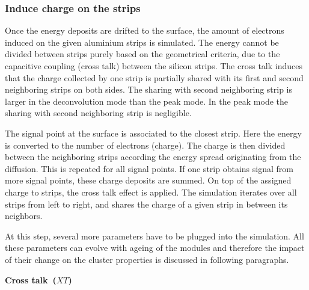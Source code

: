 
\subsubsection{Induce charge on the strips~\label{sec:induce}}

Once the energy deposits are drifted to the surface, the amount of electrons induced on the given aluminium strips is simulated. The energy cannot be divided between strips purely based on the geometrical criteria, due to the capacitive coupling (cross talk) between the silicon strips. The cross talk induces that the charge collected by one strip is partially shared with its first and second neighboring strips on both sides. The sharing with second neighboring strip is larger in the deconvolution mode than the peak mode. In the peak mode the sharing with second neighboring strip is negligible.   

The signal point at the surface is associated to the closest strip. Here the energy is converted to the number of electrons (charge). The charge is then divided between the neighboring strips according the energy spread originating from the diffusion. This is repeated for all signal points. If one strip obtains signal from more signal points, these charge deposits are summed. On top of the assigned charge to strips, the cross talk effect is applied. The simulation iterates over all strips from left to right, and shares the charge of a given strip in between its neighbors.

At this step, several more parameters have to be plugged into the simulation. All these parameters can evolve with ageing of the modules and therefore the impact of their change on the cluster properties is discussed in following paragraphs. 

\textbf{Cross talk~($XT$)}

